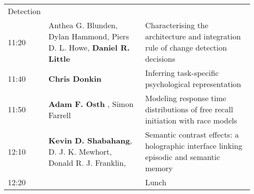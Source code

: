 \documentclass[]{article}
\begin{document}
\begin{longtable}[]{@{}lll@{}}
\begin{minipage}[t]{0.53\columnwidth}
Detection\strut
\end{minipage}\tabularnewline
\begin{minipage}[t]{0.03\columnwidth}\raggedright\strut
11:20\strut
\end{minipage} & \begin{minipage}[t]{0.35\columnwidth}\raggedright\strut
Anthea G. Blunden, Dylan Hammond, Piers D. L. Howe, \textbf{Daniel R.
Little}\strut
\end{minipage} & \begin{minipage}[t]{0.53\columnwidth}\raggedright\strut
Characterising the architecture and integration rule of change detection
decisions\strut
\end{minipage}\tabularnewline
\begin{minipage}[t]{0.03\columnwidth}\raggedright\strut
11:40\strut
\end{minipage} & \begin{minipage}[t]{0.35\columnwidth}\raggedright\strut
\textbf{Chris Donkin}\strut
\end{minipage} & \begin{minipage}[t]{0.53\columnwidth}\raggedright\strut
Inferring task-specific psychological representation\strut
\end{minipage}\tabularnewline
\begin{minipage}[t]{0.03\columnwidth}\raggedright\strut
11:50\strut
\end{minipage} & \begin{minipage}[t]{0.35\columnwidth}\raggedright\strut
\textbf{Adam F. Osth} , Simon Farrell\strut
\end{minipage} & \begin{minipage}[t]{0.53\columnwidth}\raggedright\strut
Modeling response time distributions of free recall initiation with race
models\strut
\end{minipage}\tabularnewline
\begin{minipage}[t]{0.03\columnwidth}\raggedright\strut
12:10\strut
\end{minipage} & \begin{minipage}[t]{0.35\columnwidth}\raggedright\strut
\textbf{Kevin D. Shabahang}, D. J. K. Mewhort, Donald R. J.
Franklin,\strut
\end{minipage} & \begin{minipage}[t]{0.53\columnwidth}\raggedright\strut
Semantic contrast effects: a holographic interface linking episodic and
semantic memory\strut
\end{minipage}\tabularnewline
\begin{minipage}[t]{0.03\columnwidth}\raggedright\strut
12:20\strut
\end{minipage} & \begin{minipage}[t]{0.35\columnwidth}\raggedright\strut
\strut
\end{minipage} & \begin{minipage}[t]{0.53\columnwidth}\raggedright\strut
Lunch\strut
\end{minipage}\tabularnewline
\bottomrule
\end{longtable}
\end{document}
